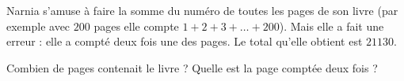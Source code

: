 
\begin{exercice}\label{exosmath-0905}

    Narnia s'amuse à faire la somme du numéro de toutes les pages de son livre (par exemple avec \( 200\) pages elle compte \( 1+2+3+\ldots+200\)). Mais elle a fait une erreur : elle a compté deux fois une des pages. Le total qu'elle obtient est \( 21130\).

    Combien de pages contenait le livre ? Quelle est la page comptée deux fois ?

\end{exercice}
